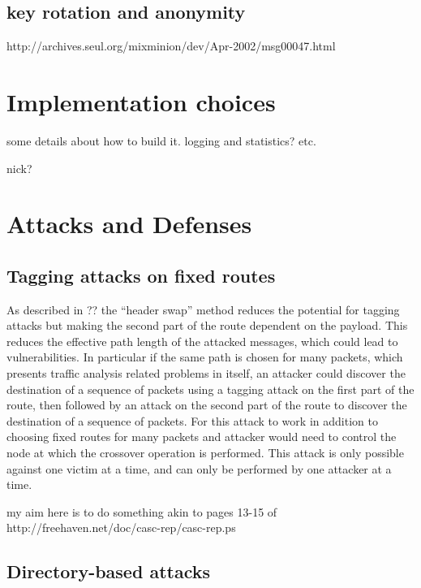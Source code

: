 \documentclass{llncs}
\begin{document}
\subsection{key rotation and anonymity}

http://archives.seul.org/mixminion/dev/Apr-2002/msg00047.html


\section{Implementation choices}
\label{sec:implementation}

some details about how to build it. logging and statistics? etc.

nick?


\section{Attacks and Defenses}
\label{sec:attacks}

\subsection{Tagging attacks on fixed routes}

As described in ?? the ``header swap'' method reduces the potential for tagging attacks but making the second part of the route dependent on the payload. This reduces the effective path length of the attacked messages, which could lead to vulnerabilities. In particular if the same path is chosen for many packets, which presents traffic analysis related problems in itself, an attacker could discover the destination of a sequence of packets using a tagging attack on the first part of the route, then followed by an attack on the second part of the route to discover the destination of a sequence of packets. For this attack to work in addition to choosing fixed routes for many packets and attacker would need to control the node at which the crossover operation is performed. This attack is only possible against one victim at a time, and can only be performed by one attacker at a time.

my aim here is to do something akin to pages 13-15 of
http://freehaven.net/doc/casc-rep/casc-rep.ps



\subsection{Directory-based attacks}
\label{subsec:attacks-dirbased}
\end{document}
